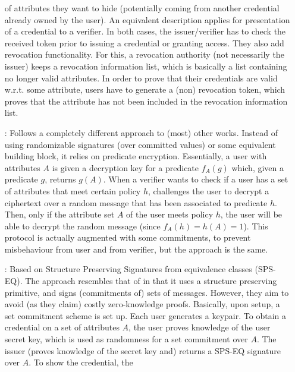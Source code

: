 \begin{enumerate}
  of attributes they want to hide (potentially coming from another credential
  already owned by the user). An equivalent description applies for presentation
  of a credential to a verifier. In both cases, the issuer/verifier has to
  check the received token prior to issuing a credential or granting access.
  They also add revocation functionality. For this, a revocation authority
  (not necessarily the issuer) keeps a revocation information list, which is
  basically a list containing no longer valid attributes. In order to prove
  that their credentials are valid w.r.t. some attribute, users have to generate
  a (non) revocation token, which proves that the attribute has not been
  included in the revocation information list.
\item[\cite{dmm+18}:] Follows a completely different approach to (most) other
  works. Instead of using randomizable signatures (over committed values) or
  some equivalent building block, it relies on predicate encryption.
  Essentially, a user with attributes $A$ is given a decryption key for a
  predicate $f_A(g)$ which, given a predicate $g$, returns $g(A)$. When
  a verifier wants to check if a user has a set of attributes that meet
  certain policy $h$, challenges the user to decrypt a ciphertext over
  a random message that has been associated to predicate $h$. Then, only
  if the attribute set $A$ of the user meets policy $h$, the user will be
  able to decrypt the random message (since $f_A(h) = h(A) = 1$). This
  protocol is actually augmented with some commitments, to prevent
  misbehaviour from user and from verifier, but the approach is the same.
\item[\cite{fhs19}:] Based on Structure Preserving Signatures from equivalence
  classes (SPS-EQ). The approach resembles that of \cite{ckl+15} in that it
  uses a structure preserving primitive, and signs (commitments of) sets of
  messages. However, they aim to avoid (as they claim) costly zero-knowledge
  proofs. Basically, upon setup, a set commitment scheme is set up. Each user
  generates a keypair. To obtain a credential on a set of attributes $A$, the
  user proves knowledge of the user secret key, which is used as randomness
  for a set commitment over $A$. The issuer (proves knowledge of the secret
  key and) returns a SPS-EQ signature over $A$. To show the credential, the

\end{enumerate}

